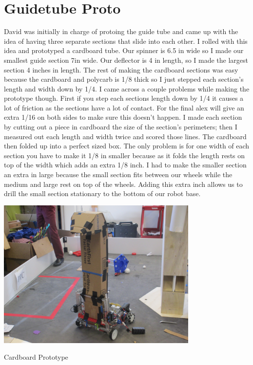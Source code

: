 \section*{Guidetube Proto}
David was initially in charge of protoing the guide tube and came up with the idea of having three separate sections that slide into each other. I rolled with this idea and prototyped a cardboard tube. Our spinner is 6.5 in wide so I made our smallest guide section 7in wide. Our deflector is 4 in length, so I made the largest section 4 inches in length. The rest of making the cardboard sections was easy because the cardboard and polycarb is 1/8 thick so I just stepped each section’s length and width down by 1/4. I came across a couple problems while making the prototype though. First if you step each sections length down by 1/4 it causes a lot of friction as the sections have a lot of contact. For the final alex will give an extra 1/16 on both sides to make sure this doesn’t happen. I made each section by cutting out a piece in cardboard the size of the section’s perimeters; then I measured out each length and width twice and scored those lines. The cardboard then folded up into a perfect sized box. The only problem is for one width of each section you have to make it 1/8 in smaller because as it folds the length rests on top of the width which adds an extra 1/8 inch. I had to make the smaller section an extra in large because the small section fits between our wheels while the medium and large rest on top of the wheels. Adding this extra inch allows us to drill the small section stationary to the bottom of our robot base.

\begin{center}
\includegraphics[width=10cm]{./Entries/Images/CardboardProto.JPG}
\end{center}

Cardboard Prototype

